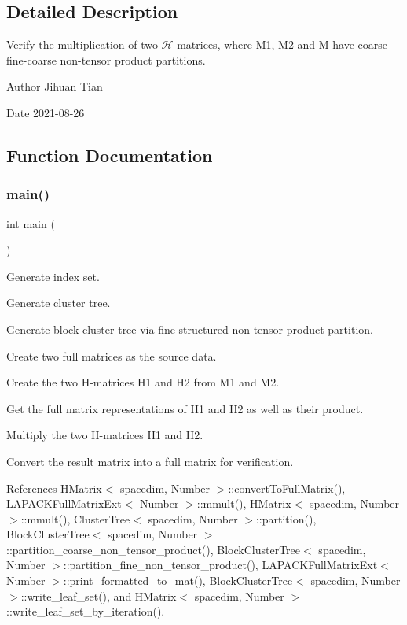 \subsection{Detailed Description}
Verify the multiplication of two $\mathcal{H}$-\/matrices, where M1, M2 and M have coarse-\/fine-\/coarse non-\/tensor product partitions. 

\begin{DoxyAuthor}{Author}
Jihuan Tian 
\end{DoxyAuthor}
\begin{DoxyDate}{Date}
2021-\/08-\/26 
\end{DoxyDate}


\subsection{Function Documentation}
\mbox{\label{hmatrix-hmatrix-mmult-coarse-fine-coarse-ntp_8cc_ae66f6b31b5ad750f1fe042a706a4e3d4}} 
\subsubsection{\texorpdfstring{main()}{main()}}
{\footnotesize\ttfamily int main (\begin{DoxyParamCaption}{ }\end{DoxyParamCaption})}

Generate index set.

Generate cluster tree.

Generate block cluster tree via fine structured non-\/tensor product partition.

Create two full matrices as the source data.

Create the two H-\/matrices {\ttfamily H1} and {\ttfamily H2} from {\ttfamily M1} and {\ttfamily M2}.

Get the full matrix representations of {\ttfamily H1} and {\ttfamily H2} as well as their product.

Multiply the two H-\/matrices {\ttfamily H1} and {\ttfamily H2}.

Convert the result matrix into a full matrix for verification.

References H\+Matrix$<$ spacedim, Number $>$\+::convert\+To\+Full\+Matrix(), L\+A\+P\+A\+C\+K\+Full\+Matrix\+Ext$<$ Number $>$\+::mmult(), H\+Matrix$<$ spacedim, Number $>$\+::mmult(), Cluster\+Tree$<$ spacedim, Number $>$\+::partition(), Block\+Cluster\+Tree$<$ spacedim, Number $>$\+::partition\+\_\+coarse\+\_\+non\+\_\+tensor\+\_\+product(), Block\+Cluster\+Tree$<$ spacedim, Number $>$\+::partition\+\_\+fine\+\_\+non\+\_\+tensor\+\_\+product(), L\+A\+P\+A\+C\+K\+Full\+Matrix\+Ext$<$ Number $>$\+::print\+\_\+formatted\+\_\+to\+\_\+mat(), Block\+Cluster\+Tree$<$ spacedim, Number $>$\+::write\+\_\+leaf\+\_\+set(), and H\+Matrix$<$ spacedim, Number $>$\+::write\+\_\+leaf\+\_\+set\+\_\+by\+\_\+iteration().

